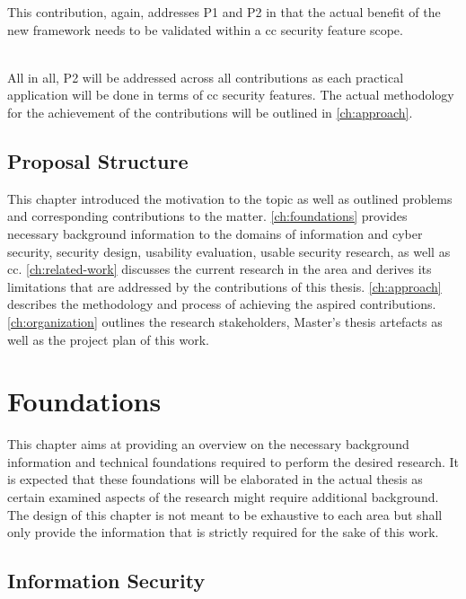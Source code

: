 This contribution, again, addresses P1 and P2 in that the actual benefit of the new framework needs to be validated within a \ac{cc} security feature scope. \\\

All in all, P2 will be addressed across all contributions as each practical application will be done in terms of \ac{cc} security features. The actual methodology for the achievement of the contributions will be outlined in \autoref{ch:approach}.

\section{Proposal Structure} \label{sec:intro-structure}
This  chapter introduced the motivation to the topic as well as outlined problems and corresponding contributions to the matter. \autoref{ch:foundations} provides necessary background information to the domains of information and cyber security, security design, usability evaluation, usable security research, as well as \acl{cc}. \autoref{ch:related-work} discusses the current research in the area and derives its limitations that are addressed by the contributions of this thesis. \autoref{ch:approach} describes the methodology and process of achieving the aspired contributions. \autoref{ch:organization} outlines the research stakeholders, Master's thesis artefacts as well as the project plan of this work.


\chapter{Foundations} \label{ch:foundations}
This chapter aims at providing an overview on the necessary background information and technical foundations required to perform the desired research. It is expected that these foundations will be elaborated in the actual thesis as certain examined aspects of the research might require additional background. The design of this chapter is not meant to be exhaustive to each area but shall only provide the information that is strictly required for the sake of this work.

\section{Information Security} \label{sec:foundations-security}

